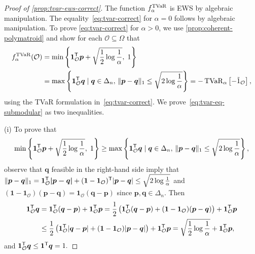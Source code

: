 \documentclass[10pt]{article} %
\begin{document}
\begin{proof}[Proof of \cref{prop:tvar-ews-correct}]
The function $f_{\alpha }^{\operatorname{TVaR}}$ is EWS by algebraic manipulation. The equality~\eqref{eq:tvar-correct} for $\alpha = 0$ follows by algebraic manipulation. To prove \eqref{eq:tvar-correct} for $\alpha > 0$, we use \cref{prop:coherent-polymatroid} and show for each $\mathcal{O} \subseteq \Omega$ that
\begin{equation}\label{eq:tvar-eq-submodular}
  \begin{aligned}
f_{\alpha}^{\operatorname{TVaR}}(\mathcal{O}) 
  &=
\min\left\{ \bm{1}_{\mathcal{O}}^{\mathsf{T}} \bm{p} + \sqrt{\frac{1}{2} \log \frac{1}{\alpha}} ,\; 1 \right\} \\
  &=
\max \left\{ \bm{1}_{\mathcal{O}}^{\mathsf{T}} \bm{q} \mid 
\bm{q} \in \Delta_n, \,
\|\bm{p} -\bm{q}\|_1 \le \sqrt{2 \log \frac{1}{\alpha}} 
\right\}
=
  -\operatorname{TVaR}_{\alpha } \left[- \tilde{1}_{\mathcal{O}}\right],
  \end{aligned}
\end{equation}
using the TVaR formulation in~\eqref{eq:tvar-correct}. We prove~\eqref{eq:tvar-eq-submodular} as two inequalities.

(i) To prove that 
\[
  \min\left\{ \bm{1}_{\mathcal{O}}^{\mathsf{T}} \bm{p} + \sqrt{\frac{1}{2} \log \frac{1}{\alpha}}  ,\; 1 \right\}
  \ge \max \left\{ \bm{1}_{\mathcal{O}}^{\mathsf{T}} \bm{q} \mid 
\bm{q} \in \Delta_n, \,
\|\bm{p} -\bm{q}\|_1 \le \sqrt{2 \log \frac{1}{\alpha}}  
\right\},
\]
observe that $\bm{q}$ feasible in the right-hand side imply that \(  \|\bm{p} - \bm{q}\|_1 = \bm{1}_{\mathcal{O}}^{\mathsf{T}} \bm{|p - q|} + (\bm{1} - \bm{1}_{\mathcal{O}})^{\mathsf{T}} |\bm{p} - \bm{q}|
  \leq \sqrt{2 \log \frac{1}{\alpha }} \) and $(\bm{1} - \bm{1}_{\mathcal{O}}) (\bm{p} - \bm{q}) = \bm{1}_{\mathcal{O}} (\bm{q} - \bm{p})$ since $\bm{p},\bm{q}\in \Delta_n$. Then
\begin{align*}
  \bm{1}_{\mathcal{O}}^{\mathsf{T}} \bm{q}
  &= \bm{1}_{\mathcal{O}}^{\mathsf{T}} (\bm{q} - \bm{p}) + \bm{1}_{\mathcal{O}}^{\mathsf{T}}  \bm{p} 
  = \frac{1}{2}\left(  \bm{1}_{\mathcal{O}}^{\mathsf{T}} (\bm{q} - \bm{p})  + (\bm{1} - \bm{1}_{\mathcal{O}}) (\bm{p} - \bm{q}) \right)+ \bm{1}_{\mathcal{O}}^{\mathsf{T}}  \bm{p} \\
  &\le \frac{1}{2}\left(  \bm{1}_{\mathcal{O}}^{\mathsf{T}} |\bm{q} - \bm{p}|  + (\bm{1} - \bm{1}_{\mathcal{O}}) |\bm{p} - \bm{q}| \right)+ \bm{1}_{\mathcal{O}}^{\mathsf{T}}  \bm{p} 
  = \sqrt{\frac{1}{2} \log \frac{1}{\alpha }} + \bm{1}_{\mathcal{O}}^{\mathsf{T}}  \bm{p} ,
\end{align*}
and  \(  \bm{1}_{\mathcal{O}}^{\mathsf{T}} \bm{q} \leq \bm{1}^{\mathsf{T}} \bm{q}  = 1.\)


\end{proof}
\end{document}
